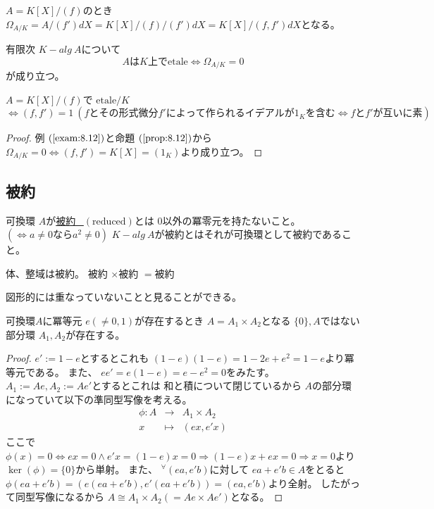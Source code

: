 \documentclass[../master_galois_theory]{subfiles}
\begin{document}
\begin{exam} \label{exam:8.12}
  $A = K[X]/(f)$のとき
  $\Omega_{A/K} = A/(f') dX = K[X]/(f)/(f') dX = K[X]/(f,f') dX$となる。
\end{exam}

\begin{prop} \label{prop:8.12}
  有限次 $K-alg \  A$について
  \[
  Aは K上で \mathrm{etale} \Leftrightarrow \Omega_{A/K} = 0
  \]
  が成り立つ。
\end{prop}

\begin{corl} \label{corl:8.12}
  $A = K[X]/(f)$で $\mathrm{etale}/K$ $\Leftrightarrow (f,f') = 1 \  (fとその形式微分 f'によって作られるイデアルが 1_Kを含む \Leftrightarrow fとf'が互いに素)$
\end{corl}

\begin{proof}
  例 $(\mathrm{\ref{exam:8.12}})$と命題 $(\mathrm{\ref{prop:8.12}})$から
  $\Omega_{A/K} = 0 \Leftrightarrow  (f,f') = K[X] = (1_K)$より成り立つ。
\end{proof}

\subsection{被約}

\begin{defi}
  可換環 $A$が\underline{被約 \  $(\mathrm{reduced})$}とは
  $0$以外の冪零元を持たないこと。 $(\Leftrightarrow a \neq 0 なら a^2 \neq 0)$
  $K-alg \  A$が被約とはそれが可換環として被約であること。
\end{defi}

\begin{exam}
  体、整域は被約。
  被約 $\times$被約 $=$被約

  図形的には重なっていないことと見ることができる。
\end{exam}

\begin{lemm} \label{lemm:idempotent}
  可換環$A$に冪等元 $e (\neq 0 , 1)$が存在するとき
  $A = A_1 \times A_2$となる $\{ 0 \} , A$ではない
  部分環 $A_1 , A_2$が存在する。
\end{lemm}

\begin{proof}
  $e' := 1 - e$とするとこれも
  $(1 - e)(1 - e) = 1 - 2e + e^2 = 1 - e$より冪等元である。
  また、 $e e' = e (1 - e) = e - e^2 = 0$をみたす。
  $A_1 := Ae , A_2 := Ae'$とするとこれは 和と積について閉じているから
  $A$の部分環になっていて以下の準同型写像を考える。
  \begin{eqnarray*}
    \phi : A & \longrightarrow & A_1 \times A_2 \\
    x & \longmapsto & (ex , e'x)
  \end{eqnarray*}
  ここで $\phi(x) = 0 \Leftrightarrow ex = 0 \land e'x = (1 - e)x = 0 \Rightarrow (1 - e)x + ex = 0 \Rightarrow x = 0$より $\ker(\phi) = \{ 0 \}$から単射。
  また、 ${}^\forall (ea , e'b)$に対して
  $ea + e'b \in A$をとると
  $\phi(ea + e'b) = (e(ea + e'b) , e'(ea + e'b) ) = (ea , e'b)$より全射。
  したがって同型写像になるから $A \cong A_1 \times A_2 (= Ae \times Ae')$となる。
\end{proof}
\end{document}
